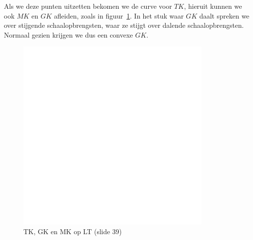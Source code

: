 Als we deze punten uitzetten bekomen we de curve voor $TK$, hieruit kunnen we ook $MK$ en $GK$ afleiden, zoals in figuur~\ref{fig:LTTKGKMK}. In het stuk waar $GK$ daalt spreken we over stijgende schaalopbrengsten, waar ze stijgt over dalende schaalopbrengsten. Normaal gezien krijgen we dus een convexe $GK$. 
\begin{figure}[htbp]
	\centering
	\includegraphics[scale=0.4]{Images/white.png}
	\caption{TK, GK en MK op LT (slide 39)}
	\label{fig:LTTKGKMK}
\end{figure}
